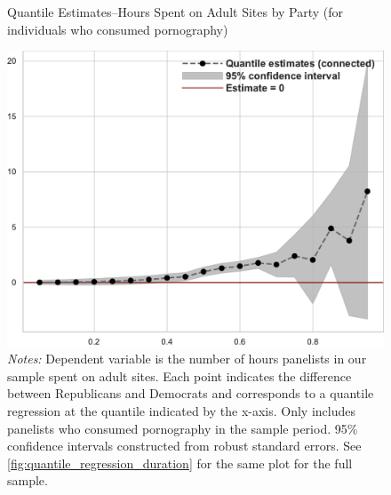 \documentclass[12pt, letterpaper]{article}
\begin{document}
\begin{figure}[ht]
	\centering
	\caption{Quantile Estimates--Hours Spent on Adult Sites by Party (for individuals who consumed pornography)}
	\includegraphics[width=.55\linewidth]{../figs/quantile_reg_nonzero_duration_adult.pdf}
	\caption*{\footnotesize \emph{Notes:} 
		Dependent variable is the number of hours panelists in our sample spent on adult sites.
		Each point indicates the difference between Republicans and Democrats and corresponds to a quantile regression at the quantile indicated by the x-axis.
		Only includes panelists who consumed pornography in the sample period.
		95\% confidence intervals constructed from robust standard errors.
		See \cref{fig:quantile_regression_duration} for the same plot for the full sample.
	}
	\label{fig:quantile_regression_duration_nonzeroes}
\end{figure}
\end{document}

